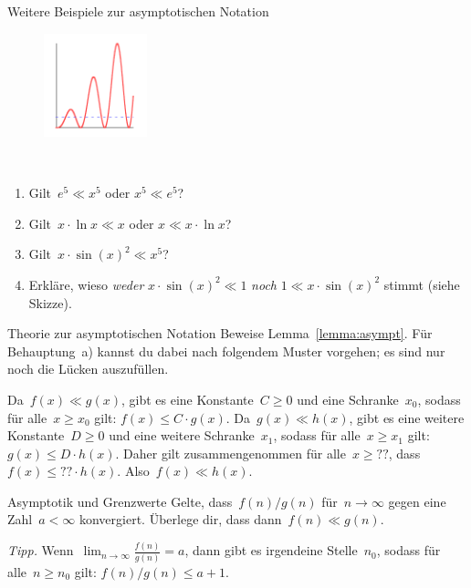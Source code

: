 \documentclass[twoside]{../zirkelblatt1415}
\theoremstyle{definition}
\theoremstyle{plain}
\theoremstyle{remark}
\begin{document}
\begin{aufgabe}{Weitere Beispiele zur asymptotischen Notation}
\begin{figure}
\includegraphics[width=3cm]{asymptotic-notation}
\end{figure}
\ \\
\vspace{-3em}
\begin{enumerate}
\item Gilt~$e^5 \ll x^5$ oder $x^5 \ll e^5$?
\item Gilt~$x \cdot \ln x \ll x$ oder $x \ll x \cdot \ln x$?
\item Gilt~$x \cdot \sin(x)^2 \ll x^5$?
\item Erkläre, wieso \emph{weder} $x \cdot \sin(x)^2 \ll 1$ \emph{noch} $1 \ll x
\cdot \sin(x)^2$ stimmt (siehe Skizze).
\end{enumerate}\fixlistspacing
\end{aufgabe}

\begin{aufgabe}{Theorie zur asymptotischen Notation}
Beweise Lemma~\ref{lemma:asympt}. Für Behauptung~a) kannst du dabei nach
folgendem Muster vorgehen; es sind nur noch die Lücken auszufüllen.

Da~$f(x) \ll g(x)$, gibt es eine Konstante~$C \geq 0$ und eine Schranke~$x_0$,
sodass für alle~$x \geq x_0$ gilt: $f(x) \leq C \cdot g(x)$. Da~$g(x) \ll
h(x)$, gibt es eine weitere Konstante~$D \geq 0$ und eine weitere
Schranke~$x_1$, sodass für alle~$x \geq x_1$ gilt: $g(x) \leq D \cdot h(x)$.
Daher gilt zusammengenommen für alle~$x \geq {??}$, dass~$f(x) \leq {??} \cdot
h(x)$. Also~$f(x) \ll h(x)$.
\end{aufgabe}

\begin{aufgabe}{Asymptotik und Grenzwerte}\label{aufg:asymp-limes}
Gelte, dass~$f(n) / g(n)$ für~$n \to \infty$ gegen eine Zahl~$a < \infty$
konvergiert. Überlege dir, dass dann~$f(n) \ll g(n)$.

\emph{Tipp.} Wenn~$\lim_{n \to \infty} \frac{f(n)}{g(n)} = a$, dann gibt es
irgendeine Stelle~$n_0$, sodass für alle~$n \geq n_0$ gilt: $f(n)/g(n) \leq
a+1$.
\end{aufgabe}
\end{document}
